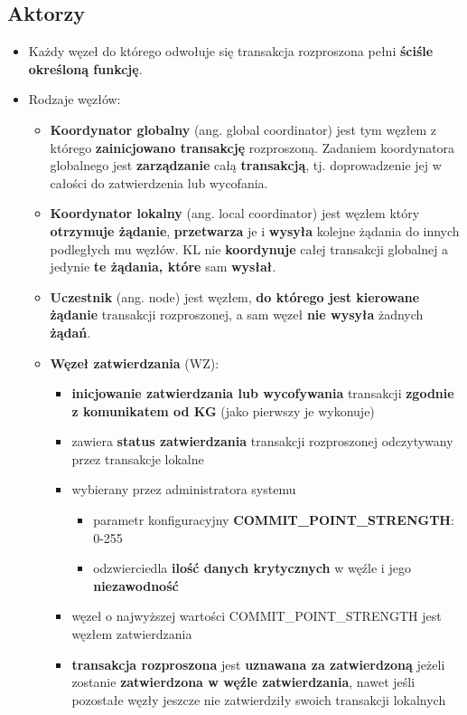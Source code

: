\documentclass[a4paper]{article}
\begin{document}
    \subsection{Aktorzy}
    \begin{itemize}
        \item Każdy węzeł do którego odwołuje się transakcja rozproszona pełni \textbf{ściśle określoną funkcję}.
        \item Rodzaje węzłów:
        \begin{itemize}
            \item \textbf{Koordynator globalny} (ang. global coordinator) jest tym węzłem z którego
            \textbf{zainicjowano transakcję} rozproszoną. Zadaniem koordynatora globalnego jest
            \textbf{zarządzanie} całą \textbf{transakcją}, tj. doprowadzenie jej w całości do zatwierdzenia lub
            wycofania.

            \item \textbf{Koordynator lokalny} (ang. local coordinator) jest węzłem który \textbf{otrzymuje
            żądanie}, \textbf{przetwarza} je i \textbf{wysyła} kolejne żądania do innych podległych mu
            węzłów. KL nie \textbf{koordynuje} całej transakcji globalnej a jedynie \textbf{te żądania, które}
            sam \textbf{wysłał}.

            \item \textbf{Uczestnik} (ang. node) jest węzłem, \textbf{do którego jest kierowane żądanie} transakcji
            rozproszonej, a sam węzeł \textbf{nie wysyła} żadnych \textbf{żądań}.

            \item \textbf{Węzeł zatwierdzania} (WZ):
            \begin{itemize}
                \item \textbf{inicjowanie zatwierdzania lub wycofywania} transakcji \textbf{zgodnie z komunikatem od KG} (jako pierwszy je wykonuje)
                \item zawiera \textbf{status zatwierdzania} transakcji rozproszonej odczytywany przez transakcje lokalne
                \item wybierany przez administratora systemu
                \begin{itemize}
                    \item parametr konfiguracyjny \textbf{COMMIT\_POINT\_STRENGTH}: 0-255
                    \item odzwierciedla \textbf{ilość danych krytycznych} w węźle i jego \textbf{niezawodność}
                \end{itemize}
                \item węzeł o najwyższej wartości COMMIT\_POINT\_STRENGTH jest węzłem zatwierdzania
                \item \textbf{transakcja rozproszona} jest \textbf{uznawana za zatwierdzoną} jeżeli zostanie \textbf{zatwierdzona w węźle
                zatwierdzania}, nawet jeśli pozostałe węzły jeszcze nie zatwierdziły swoich transakcji lokalnych
            \end{itemize}
        \end{itemize}
    \end{itemize}
\end{document}
